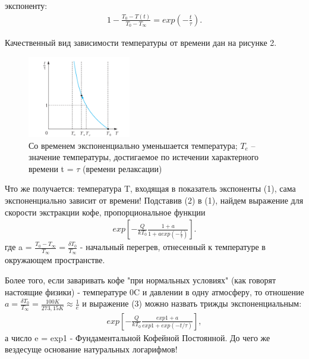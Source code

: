 \newpage
\begin{multicols}{2}
	\setlength{\abovecaptionskip}{-2pt}
	\setlength{\belowcaptionskip}{-7pt} 
    \noindent
    экспоненту:
    \begin{align}
    	\label{eq:2}
    	1-\frac{T_{0}-T(t)}{T_{0}-T_{\infty}} = exp(-\frac{t}{\tau}).
    \end{align}
    
    \noindent
    Качественный вид зависимости температуры от времени дан на рисунке 2.
    \begin{figure}[H]
    	\centering\offinterlineskip
    	\includegraphics[width=0.4\textwidth]{pic1.png}
    	\caption{Со временем экспоненциально уменьшается температура; $T_e$
    		– значение температуры, достигаемое по истечении характерного
    		времени t = $\tau$ (времени релаксации)}
    \end{figure}

    Что же получается: температура T, входящая в показатель экспоненты (1), сама экспоненциально зависит от времени! Подставив (2) в (1), найдем выражение для скорости экстракции кофе, пропорциональное функции
    \begin{align}
    	\label{eq:3}
    	exp\left[-\frac{Q}{kT_0}\frac{1+a}{1+a exp(-\frac{t}{\tau})}\right].
    \end{align}
	\noindent
    где a = $\frac{T_0 - T_\infty}{T_\infty} = \frac{\delta T_0}{T_\infty}$ - начальный перегрев,
    отнесенный к температуре в окружающем пространстве.
    
    Более того, если заваривать кофе "при нормальных условиях" (как говорят настоящие физики) - температуре 
    0\degree C и давлении в одну атмосферу, то отношение $a = \frac{\delta T_0}{T_\infty} = \frac{100 K}{273,15 K} \approx
    \frac{1}{e}$ и выражение (3) можно назвать трижды экспоненциальным:
    \begin{align}
    	\label{eq:4}
    	exp\left[-\frac{Q}{kT_0}\frac{exp1+a}{exp1+exp(-t/\tau)}\right],
    \end{align}
	а число e = exp1 - Фундаментальной Кофейной Постоянной. До чего же вездесуще основание натуральных логарифмов!
	

\end{multicols}
